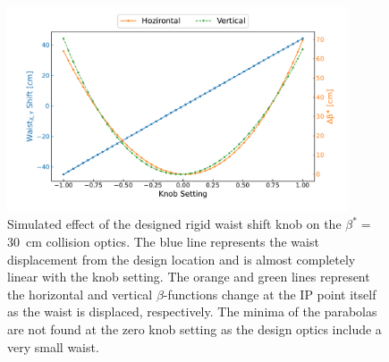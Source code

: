 \begin{figure}
    \centering
    \includegraphics[width=0.9\textwidth]{Figures/IR_Coupling_Correction/rigid_waist_shift_effect_combined.pdf}
    \caption{Simulated effect of the designed rigid waist shift knob on the \(\beta^{\ast} =\) \qty{30}{\centi\metre} collision optics. The \textcolor{mplblue}{blue} line represents the waist displacement from the design location and is almost completely linear with the knob setting. The \textcolor{mplorange}{orange} and \textcolor{mplgreen}{green} lines represent the horizontal and vertical \(\beta\)-functions change at the IP point itself as the waist is displaced, respectively. The minima of the parabolas are not found at the zero knob setting as the design optics include a very small waist.}
    \label{figure:rigid_waist_shift_knob_effect1}
\end{figure}

